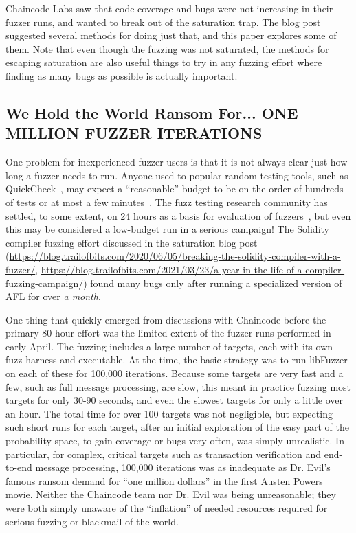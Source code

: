 Chaincode Labs saw that code coverage and bugs were not increasing in their fuzzer runs, and wanted to break out of the saturation trap.  The blog post suggested several methods for doing just that, and this paper explores some of them.  Note that even though the fuzzing was not saturated, the methods for escaping saturation are also useful things to try in any fuzzing effort where finding as many bugs as possible is actually important.

\subsection{We Hold the World Ransom For... ONE MILLION FUZZER ITERATIONS}

\begin{sloppypar}
  One problem for inexperienced fuzzer users is that it is not always clear just how long a fuzzer needs to run.  Anyone used to popular random testing tools, such as QuickCheck~\cite{ClaessenH00}, may expect a ``reasonable'' budget to be on the order of hundreds of tests or at most a few minutes~\cite{HolmesLOC}.  The fuzz testing research community has settled, to some extent, on 24 hours as a basis for evaluation of fuzzers~\cite{evalfuzz}, but even this may be considered a low-budget run in a serious campaign!  The Solidity compiler fuzzing effort discussed in the saturation blog post (\url{https://blog.trailofbits.com/2020/06/05/breaking-the-solidity-compiler-with-a-fuzzer/}, \url{https://blog.trailofbits.com/2021/03/23/a-year-in-the-life-of-a-compiler-fuzzing-campaign/}) found many bugs only after running a specialized version of AFL for over \emph{a month}.
  \end{sloppypar}

One thing that quickly emerged from discussions with Chaincode before the primary 80 hour effort was the limited extent of the fuzzer runs performed in early April.  The fuzzing includes a large number of targets, each with its own fuzz harness and executable.  At the time, the basic strategy was to run libFuzzer on each of these for 100,000 iterations.  Because some targets are very fast and a few, such as full message processing, are slow, this meant in practice fuzzing most targets for only 30-90 seconds, and even the slowest targets for only a little over an hour.  The total time for over 100 targets was not negligible, but expecting such short runs for each target, after an initial exploration of the easy part of the probability space, to gain coverage or bugs very often, was simply unrealistic.  In particular, for complex, critical targets such as transaction verification and end-to-end message processing, 100,000 iterations was as inadequate as Dr. Evil's famous ransom demand for ``one million dollars'' in the first Austen Powers movie.  Neither the Chaincode team nor Dr. Evil was being unreasonable; they were both simply unaware of the ``inflation'' of needed resources required for serious fuzzing or blackmail of the world.

